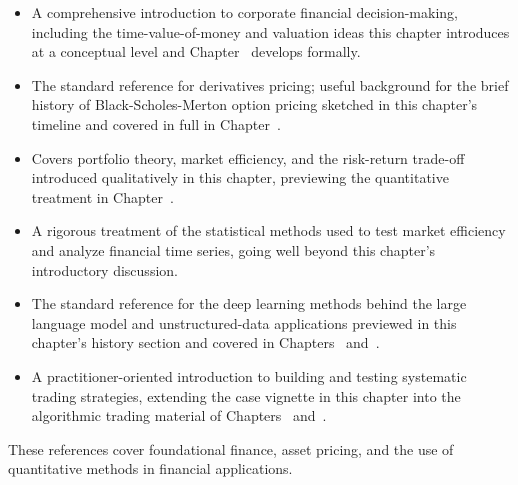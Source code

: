 \documentclass[../ai_in_finance]{subfiles}
\begin{document}
\begin{itemize}
    \item {} A comprehensive introduction to corporate financial decision-making, including the time-value-of-money and valuation ideas this chapter introduces at a conceptual level and Chapter~ develops formally.
    \item {} The standard reference for derivatives pricing; useful background for the brief history of Black-Scholes-Merton option pricing sketched in this chapter's timeline and covered in full in Chapter~.
    \item {} Covers portfolio theory, market efficiency, and the risk-return trade-off introduced qualitatively in this chapter, previewing the quantitative treatment in Chapter~.
    \item {} A rigorous treatment of the statistical methods used to test market efficiency and analyze financial time series, going well beyond this chapter's introductory discussion.
    \item {} The standard reference for the deep learning methods behind the large language model and unstructured-data applications previewed in this chapter's history section and covered in Chapters~ and~.
    \item {} A practitioner-oriented introduction to building and testing systematic trading strategies, extending the case vignette in this chapter into the algorithmic trading material of Chapters~ and~.
\end{itemize}

These references cover foundational finance, asset pricing, and the use of quantitative methods in financial applications.
\end{document}
